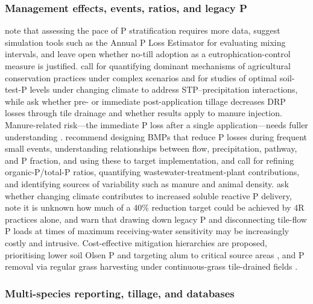 \subsubsection{Management effects, events, ratios, and legacy P}

\textcite{Uusitalo2018} note that assessing the pace of P stratification requires more data, suggest simulation tools such as the Annual P Loss Estimator for evaluating mixing intervals, and leave open whether no-till adoption as a eutrophication-control measure is justified. \textcite{Ni2020} call for quantifying dominant mechanisms of agricultural conservation practices under complex scenarios and for studies of optimal soil-test-P levels under changing climate to address STP--precipitation interactions, while \textcite{Wang2018} ask whether pre- or immediate post-application tillage decreases DRP losses through tile drainage and whether results apply to manure injection. Manure-related risk---the immediate P loss after a single application---needs fuller understanding \parencite{Madison2014}. \textcite{Brendel2019} recommend designing BMPs that reduce P losses during frequent small events, understanding relationships between flow, precipitation, pathway, and P fraction, and using these to target implementation, and \textcite{Schilling2017b} call for refining organic-P/total-P ratios, quantifying wastewater-treatment-plant contributions, and identifying sources of variability such as manure and animal density. \textcite{Jarvie2017} ask whether changing climate contributes to increased soluble reactive P delivery, note it is unknown how much of a 40\% reduction target could be achieved by 4R practices alone, and warn that drawing down legacy P and disconnecting tile-flow P loads at times of maximum receiving-water sensitivity may be increasingly costly and intrusive. Cost-effective mitigation hierarchies are proposed, prioritising lower soil Olsen P and targeting alum to critical source areas \parencite{McDowell2015}, and P removal via regular grass harvesting under continuous-grass tile-drained fields \parencite{Zhang2015b}.

\subsubsection{Multi-species reporting, tillage, and databases}

